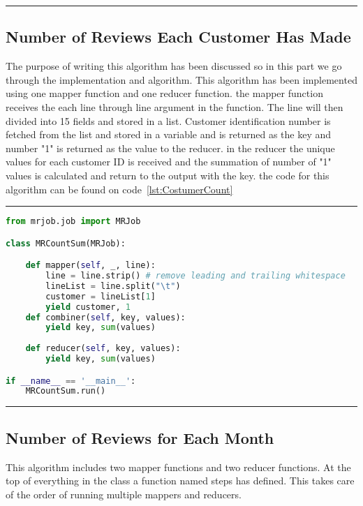 \rule{200 pt}{0.5 pt} 


\subsection{Number of Reviews Each Customer Has Made}
The purpose of writing this algorithm has been discussed so in this part we go through the implementation and algorithm. This algorithm has been implemented using one mapper function and one reducer function. the mapper function receives the each line through line argument in the function. The line will then divided into 15 fields and stored in a list. Customer identification number is fetched from the list and stored in a variable and is returned as the key and number "1" is returned as the value to the reducer. in the reducer the unique values for each customer ID is received and the summation of number of "1" values is calculated and return to the output with the key. the code for this algorithm can be found on code~\ref{lst:CostumerCount} 

\rule{200 pt}{0.5 pt} 

\renewcommand{\lstlistingname}{Code}
\lstset{style=mystyle}
\begin{lstlisting}[language=Python, caption={Number of Reviews Each Customer Has Made}, label={lst:CostumerCount}, mathescape = true, breaklines=true]
from mrjob.job import MRJob

class MRCountSum(MRJob):

    def mapper(self, _, line):
        line = line.strip() # remove leading and trailing whitespace
        lineList = line.split("\t")
        customer = lineList[1]
        yield customer, 1
    def combiner(self, key, values):
        yield key, sum(values)
        
    def reducer(self, key, values):
        yield key, sum(values)

if __name__ == '__main__':
    MRCountSum.run()
\end{lstlisting}

\rule{200 pt}{0.5 pt} 

\subsection{Number of Reviews for Each Month}
This algorithm includes two mapper functions and two reducer functions. At the top of everything in the class    a function named steps has defined. This takes care of the order of running multiple mappers and reducers.

